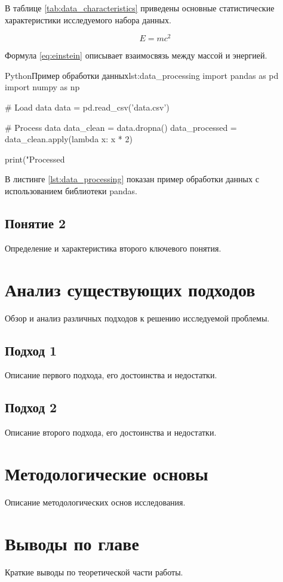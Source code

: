 В таблице \ref{tab:data_characteristics} приведены основные статистические характеристики исследуемого набора данных.

\begin{equation}
E = mc^2
\label{eq:einstein}
\end{equation}

Формула \ref{eq:einstein} описывает взаимосвязь между массой и энергией.

\begin{CodeBlock}{Python}{Пример обработки данных}{lst:data_processing}
import pandas as pd
import numpy as np

# Load data
data = pd.read_csv('data.csv')

# Process data
data_clean = data.dropna()
data_processed = data_clean.apply(lambda x: x * 2)

print("Processed %
\end{CodeBlock}

В листинге \ref{lst:data_processing} показан пример обработки данных с использованием библиотеки pandas.

\subsection{Понятие 2}

Определение и характеристика второго ключевого понятия.

\section{Анализ существующих подходов}

Обзор и анализ различных подходов к решению исследуемой проблемы.

\subsection{Подход 1}

Описание первого подхода, его достоинства и недостатки.

\subsection{Подход 2}

Описание второго подхода, его достоинства и недостатки.

\section{Методологические основы}

Описание методологических основ исследования.

\section{Выводы по главе}

Краткие выводы по теоретической части работы.
